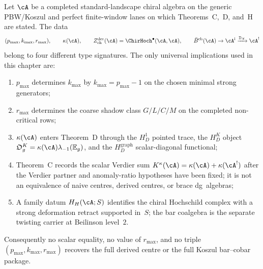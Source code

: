 \begin{proposition}
\label{prop:typed-separation-three-invariants}
\ClaimStatusConditional
Let $\cA$ be a completed standard-landscape chiral algebra on the
generic PBW/Koszul and perfect finite-window lanes on which
Theorems~\textup{C},~\textup{D}, and~\textup{H} are stated. The data
\[
(p_{\max},k_{\max},r_{\max}),\qquad
\kappa(\cA),\qquad
Z^{\mathrm{der}}_{\mathrm{ch}}(\cA)=\ChirHoch^\bullet(\cA,\cA),
\qquad
\bar B^{\mathrm{ch}}(\cA)\to \cA^{\mathrm i}\xrightarrow{\mathbb{D}_X}\cA^!
\]
belong to four different type signatures. The only universal
implications used in this chapter are:
\begin{enumerate}[label=\textup{(\roman*)}]
\item $p_{\max}$ determines $k_{\max}$ by
 $k_{\max}=p_{\max}-1$ on the chosen minimal strong generators;
\item $r_{\max}$ determines the coarse shadow class
 $G/L/C/M$ on the completed non-critical rows;
\item $\kappa(\cA)$ enters Theorem~D through the $H_D^1$ pointed
 trace, the $H_D^K$ object
 $\mathfrak O_g^K=\kappa(\cA)\lambda_{-1}(\mathbb E_g)$, and the
 $H_D^{\mathrm{graph}}$ scalar-diagonal functional;
\item Theorem~C records the scalar Verdier sum
 $K^\kappa(\cA)=\kappa(\cA)+\kappa(\cA^!)$ after the Verdier partner
 and anomaly-ratio hypotheses have been fixed; it is not an
 equivalence of naive centres, derived centres, or brace
 dg~algebras;
\item A family datum $H_H(\cA;S)$ identifies the chiral Hochschild
 complex with a strong deformation retract supported in~$S$; the bar
 coalgebra is the separate twisting carrier at Beilinson level~$2$.
\end{enumerate}
Consequently no scalar equality, no value of $r_{\max}$, and no
triple $(p_{\max},k_{\max},r_{\max})$ recovers the full derived centre
or the full Koszul bar--cobar package.
\end{proposition}

